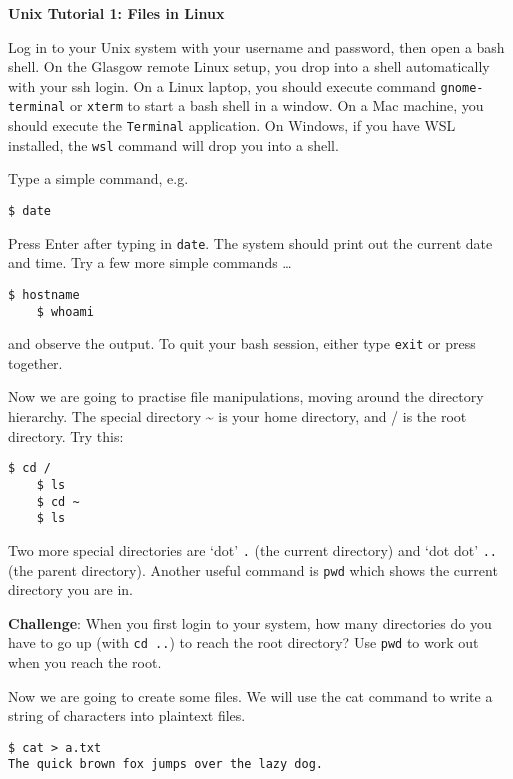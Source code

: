 \documentclass{article}
\begin{document}
\noindent
{\Large \textsf{\textbf{Unix Tutorial 1: Files in Linux}}}

\bigskip


Log in to your Unix system with your username and password, then
open a bash shell. On the Glasgow remote Linux setup, you drop into a shell automatically with your ssh login. On a Linux laptop, you should execute command \texttt{gnome-terminal} or \texttt{xterm} to start a bash shell in a window. On a Mac machine, you should execute the \texttt{Terminal} application. On Windows, if you have WSL installed, the \texttt{wsl} command will drop you into a shell.

Type a simple command, e.g.\
\begin{lstlisting}[style=BashInputStyle]
    $ date
\end{lstlisting}
Press Enter after typing in \lstinline{date}. The system should print out the current date and time.
Try a few more simple commands \ldots
\begin{lstlisting}[style=BashInputStyle]
    $ hostname
    $ whoami
\end{lstlisting}

and observe the output.
To quit your bash session, either type \lstinline{exit} or press
\keys{\ctrl + D} together.




Now we are going to practise file manipulations, moving around the directory hierarchy. The special directory \~{} is your home directory, and / is the root directory. Try this:


\begin{lstlisting}[style=BashInputStyle]
    $ cd /
    $ ls
    $ cd ~
    $ ls
\end{lstlisting}

Two more special directories are `dot' \texttt{.} (the current directory)  and `dot dot' \texttt{..} (the parent directory). Another useful command is \texttt{pwd} which shows the current directory you are in.

\textbf{Challenge}: When you first login to your system, how many directories do you have to go up (with \texttt{cd ..}) to reach the root directory? Use \texttt{pwd} to work out when you reach the root.

Now we are going to create some files. We will use the cat command to write a string of characters into plaintext files.

\begin{lstlisting}[style=BashInputStyle]
    $ cat > a.txt
The quick brown fox jumps over the lazy dog.
\end{lstlisting}
\end{document}
